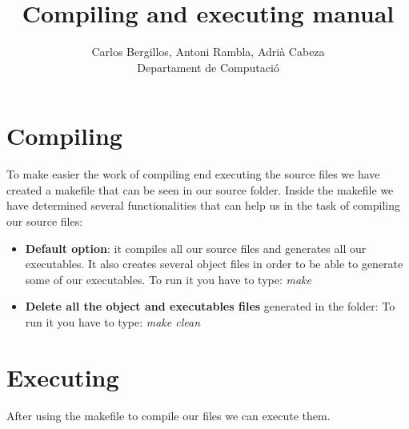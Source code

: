 \documentclass[12pt]{article}
\author{Carlos Bergillos, Antoni Rambla, Adrià Cabeza\\ Departament de Computació}
\title{Compiling and executing manual}
\begin{document}
  \maketitle  
   \newpage
   \section{Compiling}
   To make easier the work of compiling end executing the source files we have created a makefile that can be seen in our source folder. Inside the makefile we have determined several functionalities that can help us in the task of compiling our source files:
   
   \begin{itemize}
   \item \textbf{Default option}: it compiles all our source files and generates all our executables. It also creates several object files in order to be able to generate some of our executables. 
   To run it you have to type: \textit{make}
   \item \textbf{Delete all the object and executables files} generated in the folder:
   To run it you have to type: \textit{make clean}
   \end{itemize}
      \section{Executing}
         After using the makefile to compile our files we can execute them.
            
\end{document}
